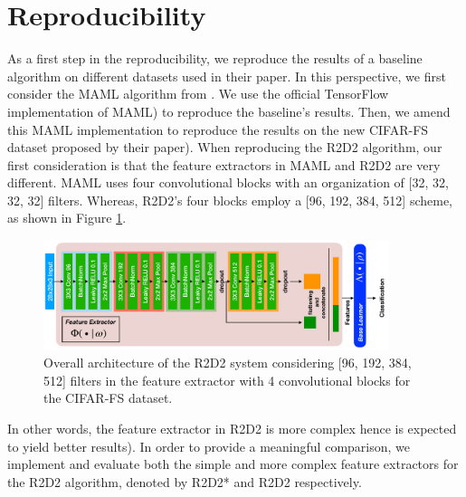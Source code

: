 \section{Reproducibility}
\label{repro}
As a first step in the reproducibility, we reproduce the results of a baseline algorithm on different datasets used in their paper. In this perspective, we first consider the MAML algorithm from \citet{finn}. We use the official TensorFlow implementation of MAML\supercite{MAML}) to reproduce the baseline's results. Then, we amend this MAML implementation to reproduce the results on the new \textsc{CIFAR-FS} dataset proposed by their paper\supercite{R2D2}).
When reproducing the R2D2 algorithm, our first consideration is that the feature extractors in MAML and R2D2 are very different. MAML uses four convolutional blocks with an organization of [32, 32, 32, 32] filters. Whereas, R2D2's four blocks employ a [96, 192, 384, 512] scheme, as shown in Figure \ref{fig:arch}.
\begin{figure}\newpage
  \centering
  \includegraphics[width=0.9\textwidth]{Archi.pdf}
  \caption{Overall architecture of the R2D2 system considering [96, 192, 384, 512] filters in the feature extractor with 4 convolutional blocks for the \textsc{CIFAR-FS} dataset.}
  \label{fig:arch}
\end{figure}
In other words, the feature extractor in R2D2 is more complex hence is expected to yield better results\supercite{mhaskar2016learning}). In order to provide a meaningful comparison, we implement and evaluate both the simple and more complex feature extractors for the R2D2 algorithm, denoted by R2D2* and R2D2 respectively.\\

